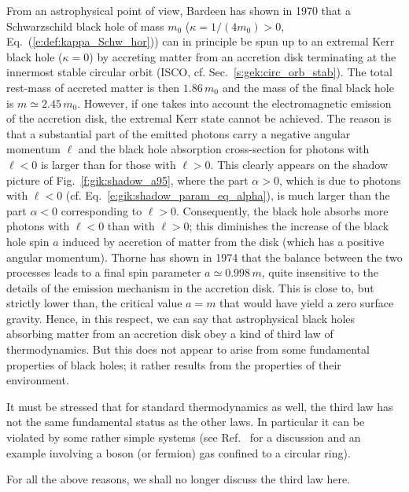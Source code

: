 From an astrophysical point of view, Bardeen has shown in 1970 \cite{Barde70a}
that a Schwarzschild black hole
of mass $m_0$ ($\kappa = 1/(4m_0) > 0$, Eq.~(\ref{e:def:kappa_Schw_hor}))
can in principle be spun up to an extremal Kerr black hole
($\kappa = 0$)
by accreting matter from an accretion disk
terminating at the innermost stable circular orbit (ISCO, cf. Sec.~\ref{s:gek:circ_orb_stab}). The total rest-mass of accreted matter is then
$1.86\, m_0$ and the mass of the final black hole is $m \simeq 2.45\, m_0$.
However, if one takes into account the electromagnetic emission of the accretion disk, the extremal Kerr state
cannot be achieved. The reason is that a substantial part of the emitted photons carry a negative angular momentum $\ell$ and
the black hole absorption cross-section for photons with $\ell<0$ is larger than for those with
$\ell>0$. This clearly appears on the shadow picture of Fig.~\ref{f:gik:shadow_a95},
where the part $\alpha>0$, which is due to photons
with $\ell < 0$ (cf. Eq.~\ref{e:gik:shadow_param_eq_alpha}), is much larger than the part $\alpha<0$
corresponding to $\ell > 0$. Consequently, the black hole absorbs more photons with $\ell < 0$
than with $\ell>0$; this diminishes the increase of the black hole spin $a$ induced by accretion of  matter from the disk (which has a positive angular momentum). Thorne has shown in 1974 \cite{Thorn74} that the balance between the two processes leads to a final spin parameter $a \simeq 0.998 \, m$, quite insensitive to the details
of the emission mechanism in the accretion disk. This is close to, but strictly lower than, the critical
value $a = m$ that would have yield a zero surface gravity. Hence, in this respect, we can say that
astrophysical black holes absorbing matter from an accretion disk obey a kind of third law of thermodynamics.
But this does not appear to arise from some fundamental properties of black holes; it rather results from the properties of their environment.

It must be stressed that for standard thermodynamics as well, the third law has not the same fundamental status as the other laws.
In particular it can be violated by some rather simple systems (see Ref.~\cite{Wald97} for a discussion and an example involving a boson (or fermion) gas confined to a circular ring).

For all the above reasons, we shall no longer discuss the third law here.

